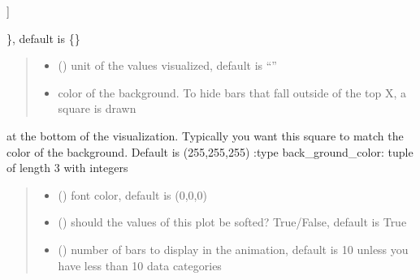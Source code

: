 \documentclass[letterpaper,10pt,english]{sphinxmanual}
\begin{document}
\begin{fulllineitems}
\begin{description}
\begin{description}
\begin{description}
\end{description}

\sphinxAtStartPar
{]}

\end{description}

\sphinxAtStartPar
\}, default is \{\}

\end{description}
\begin{quote}\begin{description}
\begin{itemize}
\item {} 
\sphinxAtStartPar
{} () \textendash{} unit of the values visualized, default is “”

\item {} 
\sphinxAtStartPar
{} \textendash{} color of the background. To hide bars that fall outside of the top X, a square is drawn

\end{itemize}

\end{description}\end{quote}

\sphinxAtStartPar
at the bottom of the visualization. Typically you want this square to match the color of the background. Default is (255,255,255)
:type back\_ground\_color: tuple of length 3 with integers
\begin{quote}\begin{description}
\begin{itemize}
\item {} 
\sphinxAtStartPar
{} () \textendash{} font color, default is (0,0,0)

\item {} 
\sphinxAtStartPar
{} () \textendash{} should the values of this plot be softed? True/False, default is True

\item {} 
\sphinxAtStartPar
{} () \textendash{} number of bars to display in the animation, default is 10 unless you have less than 10 data categories


\end{itemize}
\end{description}
\end{quote}
\end{fulllineitems}
\end{document}
